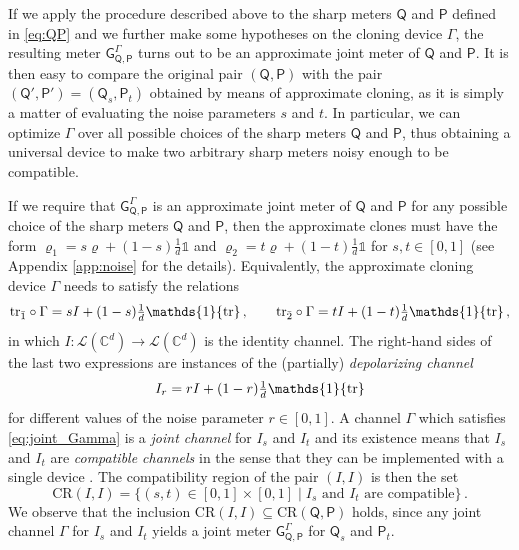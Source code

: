 \documentclass[12pt,reqno]{amsart}
\theoremstyle{definition}
\newcommand{\ptr}[2]{{\rm tr}_{#1} #2} %
\newcommand{\id}{\mathds{1}} %
\newcommand{\Qo}{\mathsf{Q}}%
\newcommand{\Po}{\mathsf{P}}%
\newcommand{\Go}{\mathsf{G}}%
\newcommand{\rhoo}{\varrho} %
\newcommand{\Cb}{\mathbb{C}} %
\newcommand{\lc}[1]{\mathcal{L}(\Cb^{#1})} %
\newcommand{\CR}[1]{\textrm{CR} #1} %
\begin{document}
If we apply the procedure described above to the sharp meters $\Qo$ and $\Po$ defined in \eqref{eq:QP} and we further make some hypotheses on the cloning device $\Gamma$, the resulting meter $\Go^\Gamma_{\Qo,\Po}$ turns out to be an approximate joint meter of $\Qo$ and $\Po$. 
It is then easy to compare the original pair $(\Qo,\Po)$ with the pair $(\Qo',\Po')=(\Qo_s,\Po_t)$ obtained by means of approximate cloning, as it is simply a matter of evaluating the noise parameters $s$ and $t$. In particular, we can optimize $\Gamma$ over all possible choices of the sharp meters $\Qo$ and $\Po$, thus obtaining a universal device to make two arbitrary sharp meters noisy enough to be compatible.

If we require that $\Go^\Gamma_{\Qo,\Po}$ is an approximate joint meter of $\Qo$ and $\Po$ for any possible choice of the sharp meters $\Qo$ and $\Po$, then the approximate clones must have the form $\rhoo_1 = s\rhoo + (1-s)\tfrac{1}{d}\id$ and $\rhoo_2 = t\rhoo + (1-t)\tfrac{1}{d}\id$ for $s,t\in [0,1]$ (see Appendix \ref{app:noise} for the details).
Equivalently, the approximate cloning device $\Gamma$ needs to satisfy the relations
\begin{equation}\label{eq:joint_Gamma}
\ptr{\bar{1}}{\circ\Gamma} = s I + (1-s)\tfrac{1}{d}\id{\rm tr}\,,\qquad \ptr{\bar{2}}{\circ\Gamma} = t I + (1-t)\tfrac{1}{d}\id{\rm tr}\,,
\end{equation}
in which $I:\lc{d}\to\lc{d}$ is the identity channel. 
The right-hand sides of the last two expressions are instances of the (partially) {\em depolarizing channel}
\begin{equation}\label{eq:Ir}
I_r = r I + (1-r)\tfrac{1}{d}\id{\rm tr}
\end{equation}
for different values of the noise parameter $r\in [0,1]$. A channel $\Gamma$ which satisfies \eqref{eq:joint_Gamma} is a {\em joint channel} for $I_s$ and $I_t$ and its existence means that $I_s$ and $I_t$ are {\em compatible channels} in the sense that they can be implemented with a single device \cite{HeMi17}. 
The compatibility region of the pair $(I,I)$ is then the set
\begin{equation*}
\CR{(I,I)} = \{(s,t) \in [0,1]\times [0,1] \mid I_s \text{ and } I_t \text{ are compatible}\}\,.
\end{equation*}
We observe that the inclusion $\CR{(I,I)}\subseteq \CR{(\Qo,\Po)}$ holds, since any joint channel $\Gamma$ for $I_s$ and $I_t$ yields a joint meter $\Go^\Gamma_{\Qo,\Po}$ for $\Qo_s$ and $\Po_t$. 
\end{document}
